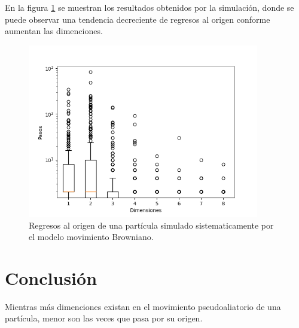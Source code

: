 \documentclass{article}
\begin{document}
En la figura \ref{fig} se muestran los resultados obtenidos por la simulaci\'{o}n, donde se puede observar una tendencia decreciente de regresos al origen conforme aumentan las dimenciones.


\begin{figure}
  \centering\includegraphics[width=0.9\textwidth]{p1_2.png}
  \caption{Regresos al origen de una part\'{i}cula simulado sistematicamente por el modelo movimiento Browniano.}
  \label{fig}
\end{figure} 



\section{Conclusi\'{o}n}

Mientras m\'{a}s dimenciones existan en el movimiento  pseudoaliatorio de una part\'{i}cula, menor son las veces que pasa por su origen.



 
\end{document}
